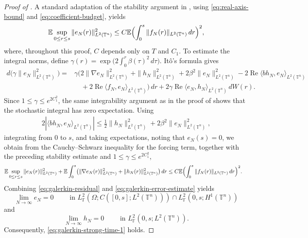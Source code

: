 \documentclass[print,wide]{draft}
\begin{document}
\begin{proof}[Proof of ]
A standard adaptation of the stability argument in
\cite[Section~4.4]{Lue2021a}, using
\eqref{eq:real-axis-bound} and \eqref{eq:coefficient-budget}, yields
\begin{align*}
\mathbb E\sup_{0\leq r\leq s}\|e_N(r)\|_{L^2(\mathbb{T}^n)}^2
\leq C\mathbb E\Bigl(\int_0^s\|f_N(r)\|_{L^2(\mathbb{T}^n)}\,dr\Bigr)^2,
\end{align*}
where, throughout this proof, \(C\) depends only on \(T\) and \(C_1\).
To estimate the integral norms, define
\(\gamma(r)=\exp\bigl(2\int_0^r\beta(\tau)^2\,d\tau\bigr)\).
It\^o's formula gives
\begin{align*}
d \bigl(\gamma\|e_N\|_{L^2(\mathbb{T}^n)}^2\bigr)
={}&\gamma\bigl(2\|\nabla e_N\|_{L^2(\mathbb{T}^n)}^2
+\|h_N\|_{L^2(\mathbb{T}^n)}^2
+2\beta^2\|e_N\|_{L^2(\mathbb{T}^n)}^2  -2\operatorname{Re}\langle bh_N,e_N\rangle_{L^2(\mathbb{T}^n)}\\
& \quad
+2\operatorname{Re}\langle f_N,e_N\rangle_{L^2(\mathbb{T}^n)}\bigr)\,dr
+2\gamma\operatorname{Re}\langle e_N,h_N\rangle_{L^2(\mathbb{T}^n)}\,dW(r).
\end{align*}
Since $1\leq\gamma\leq e^{2C_1^2}$, the same integrability argument as in the proof of
 shows that the stochastic integral has zero expectation. Using
\begin{align*}
2|\langle bh_N,e_N\rangle_{L^2(\mathbb{T}^n)}|
\leq\tfrac12\|h_N\|_{L^2(\mathbb{T}^n)}^2
+2\beta^2\|e_N\|_{L^2(\mathbb{T}^n)}^2,
\end{align*}
integrating from \(0\) to \(s\), and taking expectations, noting that \(e_N(s)=0\), we obtain
from the Cauchy--Schwarz inequality for the forcing term, together with the
preceding stability estimate and \(1\leq\gamma\leq e^{2C_1^2}\),
\begin{align}\label{eq:galerkin-error-estimate}
&\mathbb{E}\sup_{0\leq r\leq s}\|e_N(r)\|_{L^2(\mathbb{T}^n)}^2
+\mathbb{E}\int_0^s\bigl(\|\nabla e_N(r)\|_{L^2(\mathbb{T}^n)}^2
+\|h_N(r)\|_{L^2(\mathbb{T}^n)}^2\bigr)\,dr \leq C\mathbb{E}\Bigl(\int_0^s\|f_N(r)\|_{L^2(\mathbb{T}^n)}\,dr\Bigr)^2.
\end{align}
Combining \eqref{eq:galerkin-residual} and \eqref{eq:galerkin-error-estimate}
yields 
%
$$
\lim_{N\to\infty}e_N=0 \qquad\mbox{ in }L^2_{\mathbb F}(\Omega;C([0,s];L^2(\mathbb{T}^n)))
\cap L^2_{\mathbb F}(0,s;H^1(\mathbb{T}^n))
$$
%
and
%
$$
\lim_{N\to\infty}h_N=0  \qquad\mbox{ in }  L^2_{\mathbb F}(0,s;L^2(\mathbb{T}^n)).
$$
%
Consequently, \eqref{eq:galerkin-strong-time-1} holds.
\end{proof}



\end{document}
